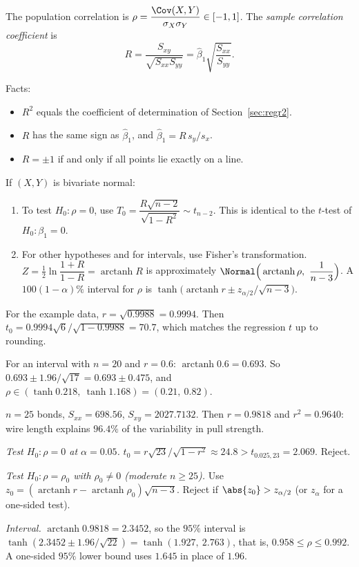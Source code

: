 \begin{definition}
The population correlation is $\rho=\dfrac{\Cov(X,Y)}{\sigma_X\sigma_Y}\in[-1,1]$. The \emph{sample correlation coefficient} is
\[ R=\frac{S_{xy}}{\sqrt{S_{xx}S_{yy}}}=\hat\beta_1\sqrt{\frac{S_{xx}}{S_{yy}}}. \]
\end{definition}

Facts:
\begin{itemize}
  \item $R^2$ equals the coefficient of determination of Section~\ref{sec:regr2}.
  \item $R$ has the same sign as $\hat\beta_1$, and $\hat\beta_1=R\,s_y/s_x$.
  \item $R=\pm1$ if and only if all points lie exactly on a line.
\end{itemize}

\begin{theorem}\label{thm:corr}
If $(X,Y)$ is bivariate normal:
\begin{enumerate}[label=(\roman*)]
  \item To test $H_0:\rho=0$, use $T_0=\dfrac{R\sqrt{n-2}}{\sqrt{1-R^2}}\sim t_{n-2}$. This is identical to the $t$-test of $H_0:\beta_1=0$.
  \item For other hypotheses and for intervals, use Fisher's transformation. $Z=\tfrac12\ln\dfrac{1+R}{1-R}=\operatorname{arctanh}R$ is approximately $\Normal\Big(\operatorname{arctanh}\rho,\ \dfrac1{n-3}\Big)$. A $100(1-\alpha)\%$ interval for $\rho$ is $\tanh\big(\operatorname{arctanh}r\pm z_{\alpha/2}/\sqrt{n-3}\big)$.
\end{enumerate}
\end{theorem}

\begin{example}
For the example data, $r=\sqrt{0.9988}=0.9994$. Then $t_0=0.9994\sqrt6/\sqrt{1-0.9988}=70.7$, which matches the regression $t$ up to rounding.

For an interval with $n=20$ and $r=0.6$: $\operatorname{arctanh}0.6=0.693$. So $0.693\pm1.96/\sqrt{17}=0.693\pm0.475$, and $\rho\in(\tanh0.218,\ \tanh1.168)=(0.21,\ 0.82)$.
\end{example}

\begin{example}
$n=25$ bonds, $S_{xx}=698.56$, $S_{xy}=2027.7132$. Then $r=0.9818$ and $r^2=0.9640$: wire length explains $96.4\%$ of the variability in pull strength.

\emph{Test $H_0:\rho=0$ at $\alpha=0.05$.} $t_0=r\sqrt{23}/\sqrt{1-r^2}\approx24.8>t_{0.025,23}=2.069$. Reject.

\emph{Test $H_0:\rho=\rho_0$ with $\rho_0\ne0$ (moderate $n\ge25$).} Use $z_0=(\operatorname{arctanh}r-\operatorname{arctanh}\rho_0)\sqrt{n-3}$. Reject if $\abs{z_0}>z_{\alpha/2}$ (or $z_\alpha$ for a one-sided test).

\emph{Interval.} $\operatorname{arctanh}0.9818=2.3452$, so the $95\%$ interval is $\tanh(2.3452\pm1.96/\sqrt{22})=\tanh(1.927,\ 2.763)$, that is, $0.958\le\rho\le0.992$. A one-sided $95\%$ lower bound uses $1.645$ in place of $1.96$.
\end{example}

